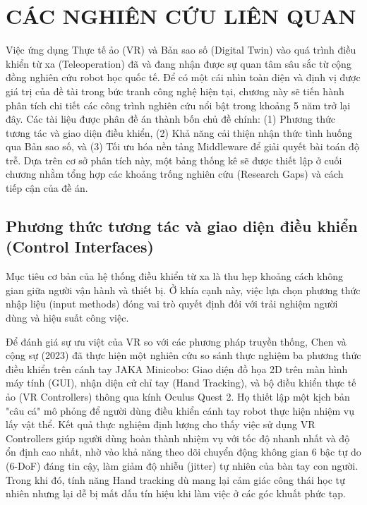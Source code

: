 \chapter{CÁC NGHIÊN CỨU LIÊN QUAN}
\label{chap:related_works}

Việc ứng dụng Thực tế ảo (VR) và Bản sao số (Digital Twin) vào quá trình điều khiển từ xa (Teleoperation) đã và đang nhận được sự quan tâm sâu sắc từ cộng đồng nghiên cứu robot học quốc tế. Để có một cái nhìn toàn diện và định vị được giá trị của đề tài trong bức tranh công nghệ hiện tại, chương này sẽ tiến hành phân tích chi tiết các công trình nghiên cứu nổi bật trong khoảng 5 năm trở lại đây. Các tài liệu được phân đề án thành bốn chủ đề chính: (1) Phương thức tương tác và giao diện điều khiển, (2) Khả năng cải thiện nhận thức tình huống qua Bản sao số, và (3) Tối ưu hóa nền tảng Middleware để giải quyết bài toán độ trễ. Dựa trên cơ sở phân tích này, một bảng thống kê sẽ được thiết lập ở cuối chương nhằm tổng hợp các khoảng trống nghiên cứu (Research Gaps) và cách tiếp cận của đề án.

\section{Phương thức tương tác và giao diện điều khiển (Control Interfaces)}

Mục tiêu cơ bản của hệ thống điều khiển từ xa là thu hẹp khoảng cách không gian giữa người vận hành và thiết bị. Ở khía cạnh này, việc lựa chọn phương thức nhập liệu (input methods) đóng vai trò quyết định đối với trải nghiệm người dùng và hiệu suất công việc. 

Để đánh giá sự ưu việt của VR so với các phương pháp truyền thống, Chen và cộng sự (2023) \cite{chen2023comparing} đã thực hiện một nghiên cứu so sánh thực nghiệm ba phương thức điều khiển trên cánh tay JAKA Minicobo: Giao diện đồ họa 2D trên màn hình máy tính (GUI), nhận diện cử chỉ tay (Hand Tracking), và bộ điều khiển thực tế ảo (VR Controllers) thông qua kính Oculus Quest 2. Họ thiết lập một kịch bản "câu cá" mô phỏng để người dùng điều khiển cánh tay robot thực hiện nhiệm vụ lấy vật thể. Kết quả thực nghiệm định lượng cho thấy việc sử dụng VR Controllers giúp người dùng hoàn thành nhiệm vụ với tốc độ nhanh nhất và độ ổn định cao nhất, nhờ vào khả năng theo dõi chuyển động không gian 6 bậc tự do (6-DoF) đáng tin cậy, làm giảm độ nhiễu (jitter) tự nhiên của bàn tay con người. Trong khi đó, tính năng Hand tracking dù mang lại cảm giác công thái học tự nhiên nhưng lại dễ bị mất dấu tín hiệu khi làm việc ở các góc khuất phức tạp. 

